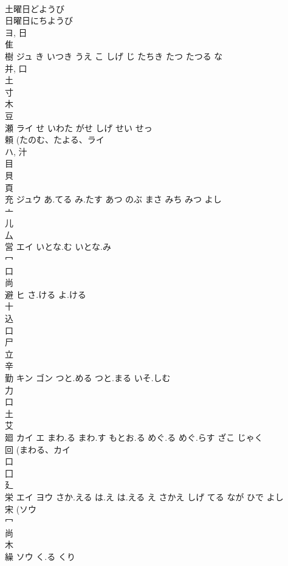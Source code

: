 \documentclass[8pt]{extreport}
\begin{document}
\begin{CJK}{UTF8}{min}
\\	土曜日どようび
\\	日曜日にちようび
\\	ヨ, 日 
\\	隹 
\\	樹	ジュ	き いつき うえ こ しげ じ たちき たつ たつる な	
\\	并, 口 
\\	土 
\\	寸 
\\	木 
\\	豆 
\\	瀬	ライ	せ いわた がせ しげ せい せっ	
\\	頼 (たのむ、たよる、ライ 
\\	ハ, 汁 
\\	目 
\\	貝 
\\	頁 
\\	充	ジュウ	あ.てる み.たす あつ のぶ まさ みち みつ よし	
\\	亠 
\\	儿 
\\	厶 
\\	営	エイ	いとな.む いとな.み	
\\	冖 
\\	口 
\\	尚 
\\	避	ヒ	さ.ける よ.ける	
\\	十 
\\	込 
\\	口 
\\	尸 
\\	立 
\\	辛 
\\	勤	キン ゴン	つと.める つと.まる いそ.しむ	
\\	力 
\\	口 
\\	土 
\\	艾 
\\	廻	カイ エ	まわ.る まわ.す もとお.る めぐ.る めぐ.らす ざこ じゃく	
\\	回 (まわる、カイ 
\\	口 
\\	囗 
\\	廴 
\\	栄	エイ ヨウ	さか.える は.え は.える え さかえ しげ てる なが ひで よし	
\\	宋 (ソウ 
\\	冖 
\\	尚 
\\	木 
\\	繰	ソウ	く.る くり	

\end{CJK}
\end{document}
